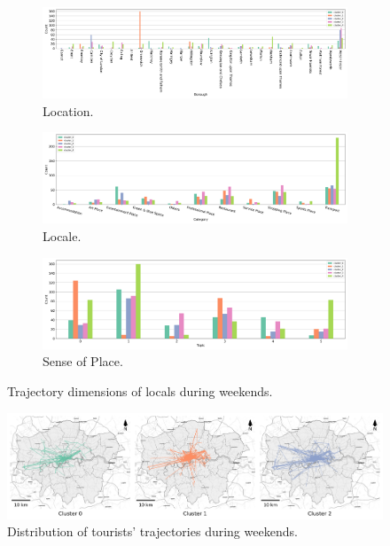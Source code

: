 \documentclass{article}
\theoremstyle{definition}
\theoremstyle{remark}
\begin{document}
\begin{figure}[!h]

\centering
\begin{subfigure}{0.6\textheight}
\centering
\includegraphics[width=1\linewidth]{figures/traj_location_weekend_locals.png}
\caption{Location.}
\label{fig:traj_location_weekend_locals}
\end{subfigure}
\begin{subfigure}{0.6\textheight}
\centering
\includegraphics[width=1\linewidth]{figures/traj_locale_weekend_locals.png}
\caption{Locale.}
\label{fig:traj_locale_weekend_locals}
\end{subfigure}
\begin{subfigure}{0.6\textheight}
\centering
\includegraphics[width=1\linewidth]{figures/traj_sense_weekend_locals.png}
\caption{Sense of Place.}
\label{fig:traj_sense_weekend_locals}
\end{subfigure}

\caption{Trajectory dimensions of locals during weekends.}
\label{fig:traj_dimension_weekend_locas}
\end{figure}


\begin{figure}[!h]
\centering
\includegraphics[width=1\textwidth]{figures/traj_distribution_weekend_tourists.png}
\caption{\label{fig:traj_distribution_weekend_tourists}Distribution of tourists' trajectories during weekends.}
\end{figure}
\end{document}
